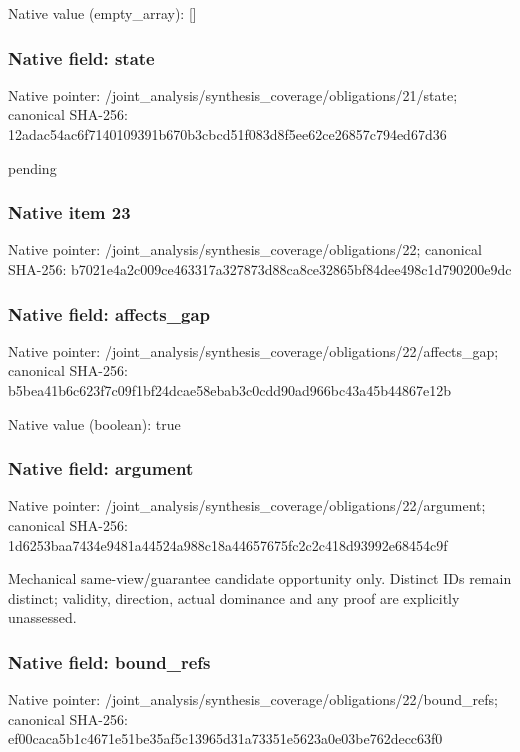 \documentclass[10pt,a4paper]{article}
\begin{document}
Native value (empty\_\allowbreak{}array): []

\subsubsection{Native field: state}
Native pointer: /joint\_\allowbreak{}analysis/synthesis\_\allowbreak{}coverage/obligations/21/state; canonical SHA-256: 12adac54ac6f7140109391b670b3cbcd51f083d8f5ee62ce26857c794ed67d36

\begingroup\raggedright\sloppy pending\par\endgroup

\subsubsection{Native item 23}
Native pointer: /joint\_\allowbreak{}analysis/synthesis\_\allowbreak{}coverage/obligations/22; canonical SHA-256: b7021e4a2c009ce463317a327873d88ca8ce32865bf84dee498c1d790200e9dc

\subsubsection{Native field: affects\_\allowbreak{}gap}
Native pointer: /joint\_\allowbreak{}analysis/synthesis\_\allowbreak{}coverage/obligations/22/affects\_\allowbreak{}gap; canonical SHA-256: b5bea41b6c623f7c09f1bf24dcae58ebab3c0cdd90ad966bc43a45b44867e12b

Native value (boolean): true

\subsubsection{Native field: argument}
Native pointer: /joint\_\allowbreak{}analysis/synthesis\_\allowbreak{}coverage/obligations/22/argument; canonical SHA-256: 1d6253baa7434e9481a44524a988c18a44657675fc2c2c418d93992e68454c9f

\begingroup\raggedright\sloppy Mechanical same-view/\allowbreak{}guarantee candidate opportunity only. Distinct IDs remain distinct;\allowbreak{} validity,\allowbreak{} direction,\allowbreak{} actual dominance and any proof are explicitly unassessed.\par\endgroup

\subsubsection{Native field: bound\_\allowbreak{}refs}
Native pointer: /joint\_\allowbreak{}analysis/synthesis\_\allowbreak{}coverage/obligations/22/bound\_\allowbreak{}refs; canonical SHA-256: ef00caca5b1c4671e51be35af5c13965d31a73351e5623a0e03be762decc63f0
\end{document}
